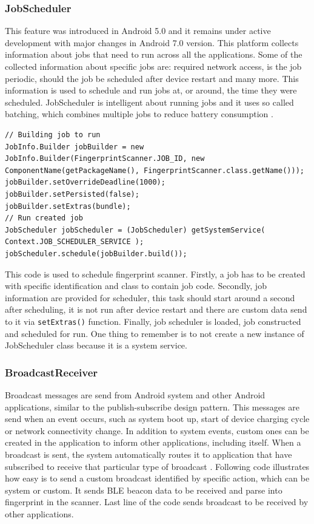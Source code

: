 \subsubsection{JobScheduler}\label{subsubsec:JobScheduler}
This feature was introduced in Android 5.0 and it remains under active development with major changes in Android 7.0 version. This platform collects information about jobs that need to run across all the applications. Some of the collected information about specific jobs are: required network access, is the job periodic, should the job be scheduled after device restart and many more. This information is used to schedule and run jobs at, or around, the time they were scheduled. JobScheduler is intelligent about running jobs and it uses so called batching, which combines multiple jobs to reduce battery consumption \cite{AD, SOTAJS}.

\begin{lstlisting}[caption=Schedule Firngerprint scanner job.]
// Building job to run
JobInfo.Builder jobBuilder = new JobInfo.Builder(FingerprintScanner.JOB_ID, new ComponentName(getPackageName(), FingerprintScanner.class.getName()));
jobBuilder.setOverrideDeadline(1000);
jobBuilder.setPersisted(false);
jobBuilder.setExtras(bundle);
// Run created job
JobScheduler jobScheduler = (JobScheduler) getSystemService( Context.JOB_SCHEDULER_SERVICE );
jobScheduler.schedule(jobBuilder.build());
\end{lstlisting}

This code is used to schedule fingerprint scanner. Firstly, a job has to be created with specific identification and class to contain job code. Secondly, job information are provided for scheduler, this task should start around a second after scheduling, it is not run after device restart and there are custom data send to it via \verb|setExtras()| function. Finally, job scheduler is loaded, job constructed and scheduled for run. One thing to remember is to not create a new instance of JobScheduler class because it is a system service.

\subsubsection{BroadcastReceiver}\label{subsubsec:BroadcastReceiver}
Broadcast messages are send from Android system and other Android applications, similar to the publish-subscribe design pattern. This messages are send when an event occurs, such as system boot up, start of device charging cycle or network connectivity change. In addition to system events, custom ones can be created in the application to inform other applications, including itself. When a broadcast is sent, the system automatically routes it to application that have subscribed to receive that particular type of broadcast \cite{AD}. Following code illustrates how easy is to send a custom broadcast identified by specific action, which can be system or custom. It sends BLE beacon data to be received and parse into fingerprint in the scanner. Last line of the code sends broadcast to be received by other applications.

